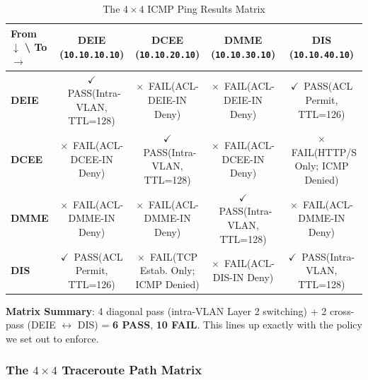 \documentclass[11pt,a4paper]{article}
\newcommand{\cmark}{\textcolor{green!60!black}{\textbf{$\checkmark$}~PASS}}
\newcommand{\xmark}{\textcolor{red!70!black}{\textbf{$\times$}~FAIL}}
\begin{document}
\begin{table}[htbp]
\centering
\caption{The $4 \times 4$ ICMP Ping Results Matrix}
\label{tab:ping_matrix}
\small
\begin{tabularx}{\textwidth}{@{}l C C C C@{}}
\toprule
\textbf{From $\downarrow$ \textbackslash{} To $\rightarrow$} & \textbf{DEIE} (\texttt{10.10.10.10}) & \textbf{DCEE} (\texttt{10.10.20.10}) & \textbf{DMME} (\texttt{10.10.30.10}) & \textbf{DIS} (\texttt{10.10.40.10}) \\
\midrule
\textbf{DEIE} & \cmark\newline (Intra-VLAN, TTL=128) & \xmark\newline (ACL-DEIE-IN Deny) & \xmark\newline (ACL-DEIE-IN Deny) & \cmark\newline (ACL Permit, TTL=126) \\
\midrule
\textbf{DCEE} & \xmark\newline (ACL-DCEE-IN Deny) & \cmark\newline (Intra-VLAN, TTL=128) & \xmark\newline (ACL-DCEE-IN Deny) & \xmark\newline (HTTP/S Only; ICMP Denied) \\
\midrule
\textbf{DMME} & \xmark\newline (ACL-DMME-IN Deny) & \xmark\newline (ACL-DMME-IN Deny) & \cmark\newline (Intra-VLAN, TTL=128) & \xmark\newline (ACL-DMME-IN Deny) \\
\midrule
\textbf{DIS} & \cmark\newline (ACL Permit, TTL=126) & \xmark\newline (TCP Estab. Only; ICMP Denied) & \xmark\newline (ACL-DIS-IN Deny) & \cmark\newline (Intra-VLAN, TTL=128) \\
\bottomrule
\end{tabularx}
\end{table}

\textbf{Matrix Summary}: 4 diagonal pass (intra-VLAN Layer 2 switching) + 2 cross-pass (DEIE $\leftrightarrow$ DIS) = \textbf{6 PASS}, \textbf{10 FAIL}. This lines up exactly with the policy we set out to enforce.

\subsubsection{The \texorpdfstring{$4 \times 4$}{4x4} Traceroute Path Matrix}
\end{document}
